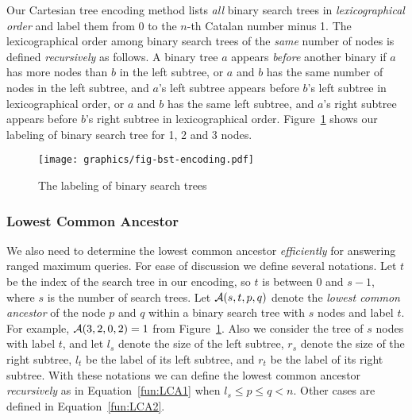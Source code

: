 Our Cartesian tree encoding method lists {\em all} binary search trees
in {\em lexicographical order} and label them from $0$ to the $n$-th
Catalan number minus 1.  The lexicographical order among binary search
trees of the {\em same} number of nodes is defined {\em recursively}
as follows.  A binary tree $a$ appears {\em before} another binary if
$a$ has more nodes than $b$ in the left subtree, or $a$ and $b$ has
the same number of nodes in the left subtree, and $a$'s left subtree
appears before $b$'s left subtree in lexicographical order, or $a$ and
$b$ has the same left subtree, and $a$'s right subtree appears before
$b$'s right subtree in lexicographical order.
Figure~\ref{fig:labelingBST} shows our labeling of binary search tree
for 1, 2 and 3 nodes.

\begin{figure}[!thb]
  \centering
  \texttt{[image: graphics/fig-bst-encoding.pdf]}
  \caption{The labeling of binary search trees}
  \label{fig:labelingBST}
\end{figure}

\subsubsection{Lowest Common Ancestor}

We also need to determine the lowest common ancestor {\em efficiently}
for answering ranged maximum queries.  For ease of discussion we
define several notations.  Let $t$ be the index of the search tree in
our encoding, so $t$ is between 0 and $s - 1$, where $s$ is the number
of search trees.  Let ${\cal A}(s, t, p, q)$ denote the {\em lowest
  common ancestor} of the node $p$ and $q$ within a binary search tree
with $s$ nodes and label $t$.  For example, ${\cal A}(3, 2, 0, 2) = 1$
from Figure~\ref{fig:labelingBST}.  Also we consider the tree of $s$
nodes with label $t$, and let $l_s$ denote the size of the left
subtree, $r_s$ denote the size of the right subtree, $l_t$ be the
label of its left subtree, and $r_t$ be the label of its right
subtree.  With these notations we can define the lowest common
ancestor {\em recursively} as in Equation~\ref{fun:LCA1} when $l_s \le
p \le q < n$.  Other cases are defined in Equation~\ref{fun:LCA2}.



